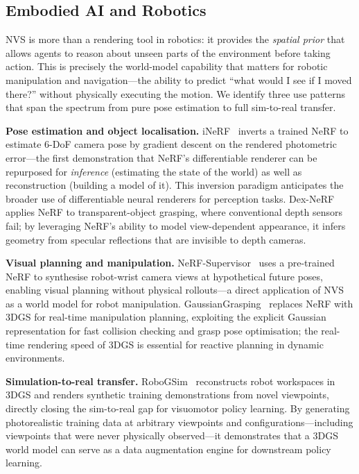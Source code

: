 \subsection{Embodied AI and Robotics}

NVS is more than a rendering tool in robotics: it provides the
\emph{spatial prior} that allows agents to reason about unseen parts of
the environment before taking action.
This is precisely the world-model capability that matters for robotic
manipulation and navigation---the ability to predict ``what would I see
if I moved there?'' without physically executing the motion.
We identify three use patterns that span the spectrum from pure pose
estimation to full sim-to-real transfer.

\textbf{Pose estimation and object localisation.}
iNeRF~\citep{yen2021inerf} inverts a trained NeRF to estimate 6-DoF camera
pose by gradient descent on the rendered photometric error---the first
demonstration that NeRF's differentiable renderer can be repurposed for
\emph{inference} (estimating the state of the world) as well as reconstruction
(building a model of it).
This inversion paradigm anticipates the broader use of differentiable
neural renderers for perception tasks.
Dex-NeRF~\citep{ichnowski2021dex} applies NeRF to transparent-object
grasping, where conventional depth sensors fail; by leveraging NeRF's
ability to model view-dependent appearance, it infers geometry from
specular reflections that are invisible to depth cameras.

\textbf{Visual planning and manipulation.}
NeRF-Supervisor~\citep{ze2023nerf_supervisor} uses a pre-trained NeRF to
synthesise robot-wrist camera views at hypothetical future poses, enabling
visual planning without physical rollouts---a direct application of NVS as
a world model for robot manipulation.
GaussianGrasping~\citep{shorinwa2024gaussiangrasping} replaces NeRF with
3DGS for real-time manipulation planning, exploiting the explicit Gaussian
representation for fast collision checking and grasp pose optimisation;
the real-time rendering speed of 3DGS is essential for reactive planning
in dynamic environments.

\textbf{Simulation-to-real transfer.}
RoboGSim~\citep{li2024robogssim} reconstructs robot workspaces in 3DGS and
renders synthetic training demonstrations from novel viewpoints, directly
closing the sim-to-real gap for visuomotor policy learning.
By generating photorealistic training data at arbitrary viewpoints and
configurations---including viewpoints that were never physically observed---it
demonstrates that a 3DGS world model can serve as a data augmentation engine
for downstream policy learning.

